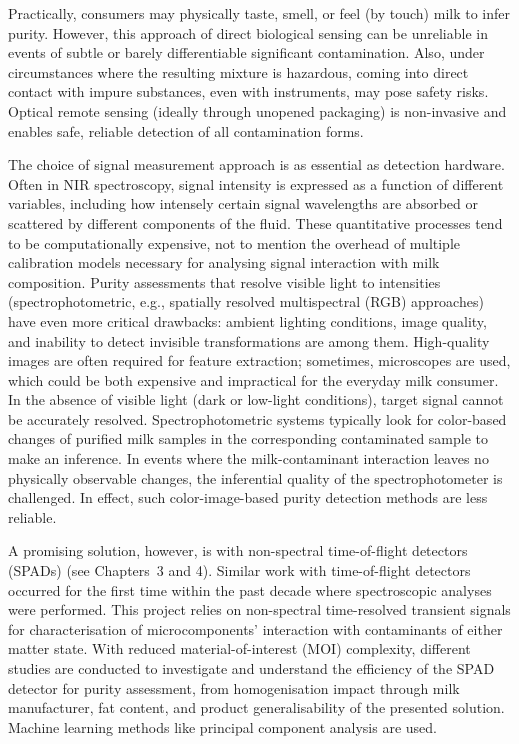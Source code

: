 \documentclass[12pt,a4paper,oneside]{report}
\begin{document}
Practically, consumers may physically taste, smell, or feel (by touch) milk to infer purity. However, this approach of direct biological sensing can be unreliable in events of subtle or barely differentiable significant contamination. Also, under circumstances where the resulting mixture is hazardous, coming into direct contact with impure substances, even with instruments, may pose safety risks. Optical remote sensing (ideally through unopened packaging) is non-invasive and enables safe, reliable detection of all contamination forms.

The choice of signal measurement approach is as essential as detection hardware. Often in NIR spectroscopy, signal intensity is expressed as a function of different variables, including how intensely certain signal wavelengths are absorbed or scattered by different components of the fluid. These quantitative processes tend to be computationally expensive, not to mention the overhead of multiple calibration models necessary for analysing signal interaction with milk composition. Purity assessments that resolve visible light to intensities (spectrophotometric, e.g., spatially resolved multispectral (RGB) approaches) have even more critical drawbacks: ambient lighting conditions, image quality, and inability to detect invisible transformations \cite{chandra2024,joolaei2025} are among them. High-quality images are often required for feature extraction; sometimes, microscopes are used, which could be both expensive and impractical for the everyday milk consumer. In the absence of visible light (dark or low-light conditions), target signal cannot be accurately resolved. Spectrophotometric systems typically look for color-based changes of purified milk samples in the corresponding contaminated sample to make an inference. In events where the milk-contaminant interaction leaves no physically observable changes, the inferential quality of the spectrophotometer is challenged. In effect, such color-image-based purity detection methods are less reliable.

A promising solution, however, is with non-spectral time-of-flight detectors (SPADs) (see Chapters~3 and 4). Similar work with time-of-flight detectors \cite{nielsen2013} occurred for the first time within the past decade where spectroscopic analyses were performed. This project relies on non-spectral time-resolved transient signals for characterisation of microcomponents' interaction with contaminants of either matter state. With reduced material-of-interest (MOI) complexity, different studies are conducted to investigate and understand the efficiency of the SPAD detector for purity assessment, from homogenisation impact through milk manufacturer, fat content, and product generalisability of the presented solution. Machine learning methods like principal component analysis are used.
\end{document}
